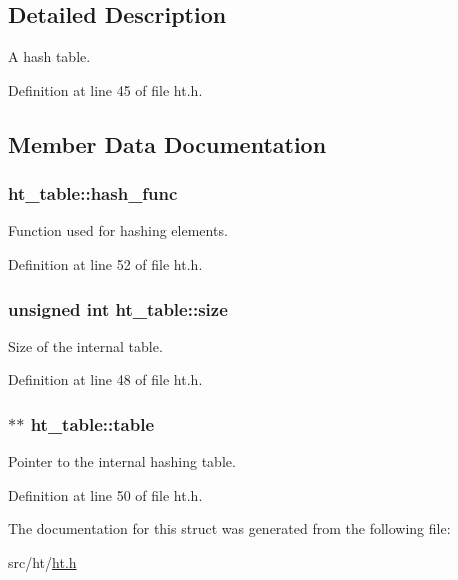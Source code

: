 \subsection{Detailed Description}
A hash table. 

Definition at line 45 of file ht.h.



\subsection{Member Data Documentation}
\hypertarget{structht__table_abe53fe8d261dea812255944769d22f45}{
\subsubsection[{hash\_\-func}]{ {\bf ht\_\-table::hash\_\-func}}}
\label{structht__table_abe53fe8d261dea812255944769d22f45}


Function used for hashing elements. 



Definition at line 52 of file ht.h.

\hypertarget{structht__table_a493b0baf20b4274a08b5451e61f8e5f4}{
\subsubsection[{size}]{\setlength{\rightskip}{0pt plus 5cm}unsigned int {\bf ht\_\-table::size}}}
\label{structht__table_a493b0baf20b4274a08b5451e61f8e5f4}


Size of the internal table. 



Definition at line 48 of file ht.h.

\hypertarget{structht__table_ae739f6f0d8b6cd6f55337ae7d0761dfc}{
\subsubsection[{table}]{$\ast$$\ast$ {\bf ht\_\-table::table}}}
\label{structht__table_ae739f6f0d8b6cd6f55337ae7d0761dfc}


Pointer to the internal hashing table. 



Definition at line 50 of file ht.h.



The documentation for this struct was generated from the following file:\begin{DoxyCompactItemize}
\item 
src/ht/\hyperlink{ht_8h}{ht.h}\end{DoxyCompactItemize}
